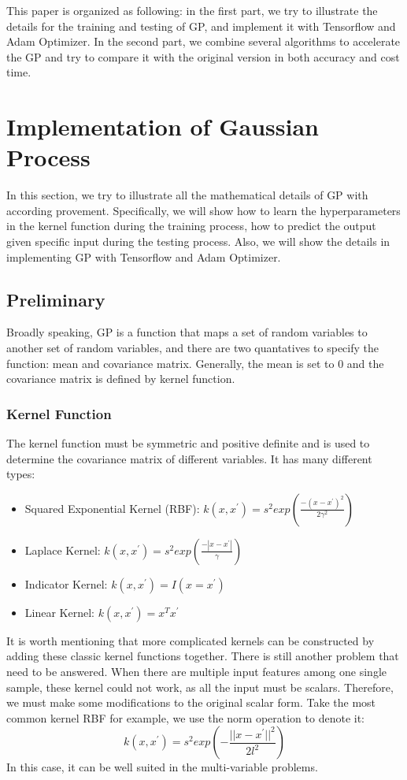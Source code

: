 \documentclass{article}
\begin{document}
This paper is organized as following: in the first part, we try to illustrate the details for the training and testing of GP, and implement it with Tensorflow and Adam Optimizer. In the second part, we combine several algorithms to accelerate the GP and try to compare it with the original version in both accuracy and cost time.

\section{Implementation of Gaussian Process}
In this section, we try to illustrate all the mathematical details of GP with according provement. Specifically, we will show how to learn the hyperparameters in the kernel function during the training process, how to predict the output given specific input during the testing process. Also, we will show the details in implementing GP with Tensorflow and Adam Optimizer. 
\subsection{Preliminary}
Broadly speaking, GP is a function that maps a set of random variables to another set of random variables, and there are two quantatives to specify the function: mean and covariance matrix. Generally, the mean is set to 0 and the covariance matrix is defined by kernel function. 
\subsubsection{Kernel Function}
The kernel function must be symmetric and positive definite and is used to determine the covariance matrix of different variables. It has many different types:
\begin{itemize}
	\item Squared Exponential Kernel (RBF): $k(x,x^{'})=s^2exp(\frac{-(x-x^{'})^2}{2\gamma^2})$
	\item Laplace Kernel: $k(x,x^{'})=s^2exp(\frac{-|x-x^{'}|}{\gamma})$
	\item Indicator Kernel: $k(x,x^{'})=I(x=x^{'})$
	\item Linear Kernel: $k(x,x^{'})=x^{T}x^{'}$
\end{itemize}
It is worth mentioning that more complicated kernels can be constructed by adding these classic kernel functions together. There is still another problem that need to be answered. When there are multiple input features among one single sample, these kernel could not work, as all the input must be scalars. Therefore, we must make some modifications to the original scalar form. Take the most common kernel RBF for example, we use the norm operation to denote it:
\begin{equation}
k(x,x^{'})=s^2exp(-\frac{||x-x^{'}||^2}{2l^2})
\end{equation}
In this case, it can be well suited in the multi-variable problems.
\end{document}
